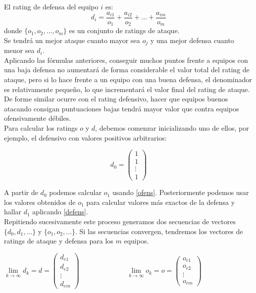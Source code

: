 El rating de defensa del equipo $i$ es:
\begin{equation}
d_{i} = \dfrac{a_{i1}}{o_{1}} + \dfrac{a_{i2}}{o_{2}} + \dots + \dfrac{a_{im}}{o_{m}}  \label{defens}
\end{equation} 
donde $\{o_{1},o_{2}, \dots ,o_{m}\}$ es un conjunto de ratings de ataque.\\

Se tendrá un mejor ataque cuanto mayor sea $o_{j}$ y una mejor defensa cuanto menor sea $d_{i}$.\\
Aplicando las fórmulas anteriores, conseguir muchos puntos frente a equipos con una baja defensa no aumentará de forma considerable el valor total del rating de ataque, pero si lo hace frente a un equipo con una buena defensa, el denominador es relativamente pequeño, lo que incrementará el valor final del rating de ataque. De forme similar ocurre con el rating defensivo, hacer que equipos buenos atacando consigan puntuaciones bajas tendrá mayor valor que contra equipos ofensivamente débiles.\\

Para calcular los ratings $o$ y $d$, debemos comenzar inicializando uno de ellos, por ejemplo, el defensivo con valores positivos arbitrarios:

\[d_{0}=
\left(\begin{array}{c}
1\\
1\\
\vdots \\
1
\end{array} \right)
\]

A partir de $d_{0}$ podemos calcular $o_{1}$ usando \ref{ofens}. Posteriormente podemos usar los valores obtenidos de $o_{1}$ para calcular valores más exactos de la defensa y hallar $d_{1}$ aplicando \ref{defens}.\\
Repitiendo sucesivamente este proceso generamos dos secuencias de vectores $\{d_{0},d_{1},\dots\}$ y $\{o_{1},o_{2},\dots\}$. Si las secuencias convergen, tendremos los vectores de ratings de ataque y defensa para los $m$ equipos.
 
\begin{center}
	$
\lim\limits_{k \rightarrow \infty} d_{k} = d = \left(\begin{array}{c}
d_{e1}\\
d_{e2}\\
\vdots \\
d_{em}
\end{array} \right)$      
\ \ \ \ \ \ \ \ \ \ \ \ \
$
\lim\limits_{k \rightarrow \infty} o_{k} = o = \left(\begin{array}{c}
o_{e1}\\
o_{e2}\\
\vdots \\
o_{em}
\end{array} \right)$
\end{center}
 

